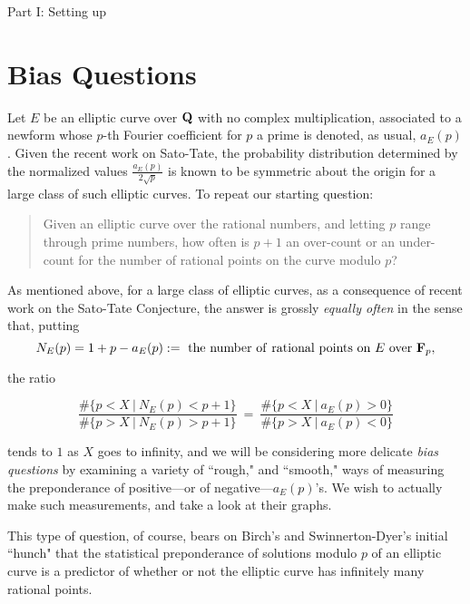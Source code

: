\documentclass[11pt]{article}
\theoremstyle{plain}
\theoremstyle{definition}
\numberwithin{equation}{section}
\numberwithin{figure}{section}
\numberwithin{table}{section}
\def\Q{\bf{Q}}
\begin{document}
\vskip20pt
 \centerline{ \Large{ Part I: Setting up}}
  \vskip30pt
 \section{Bias Questions} Let $E$ be an elliptic curve over ${\Q}$  with no complex multiplication, associated to a newform whose $p$-th Fourier coefficient for $p$ a prime is denoted, as usual, $a_E(p)$. Given the recent work on Sato-Tate, the probability distribution determined by  the normalized values   ${\frac{a_E(p)}{2{\sqrt {p}}}}$  is known to be symmetric about the origin for a large class of such elliptic curves. To repeat our starting question:

\begin{quote} Given an elliptic curve over the rational numbers, and letting  $p$ range through prime numbers, how often is $p+1$  an over-count or an under-count for the number of rational points on the curve modulo $p$?  \end{quote}



  As mentioned above,  for a large class of elliptic curves, as a consequence of recent work on the Sato-Tate Conjecture, the answer is grossly  {\it equally often} in the sense that, putting $$N_E(p)=1+p-a_E(p):=\ {\rm the \ number\ of \ rational\ points \ on\ } E\ {\rm over}\  {\bf F}_p,$$

  the ratio

 $${\frac{\#\{p < X \ | \ N_E(p) < p+1 \}} {\#\{p > X \ | \ N_E(p) > p+1 \}}}\ =\ {\frac{\#\{p < X \ | \ a_E(p) > 0 \}} {\#\{p > X \ | \ a_E(p) < 0 \}}}$$

 tends to $1$ as $X$ goes to infinity, and we will be considering more delicate {\it bias questions} by examining a variety of ``rough," and ``smooth," ways of measuring  the preponderance of positive---or of negative---$a_E(p)$'s. We wish to actually make such measurements, and take a look at their graphs.


 This type of question, of course, bears on Birch's and  Swinnerton-Dyer's initial ``hunch" that the  statistical preponderance of solutions modulo $p$ of an elliptic curve is a predictor of whether or not the elliptic curve has infinitely many rational points.
\end{document}
